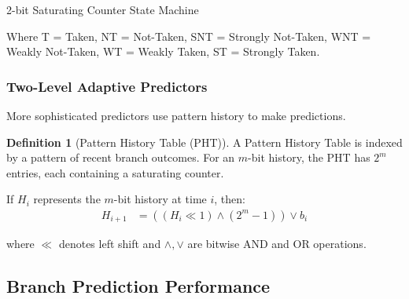 \documentclass[11pt,a4paper]{article}
\theoremstyle{definition}
\newtheorem{definition}{Definition}[section]
\begin{document}
\begin{examplebox}{2-bit Saturating Counter State Machine}
\begin{center}
\end{center}

Where T = Taken, NT = Not-Taken, SNT = Strongly Not-Taken, WNT = Weakly Not-Taken, WT = Weakly Taken, ST = Strongly Taken.
\end{examplebox}

\subsubsection{Two-Level Adaptive Predictors}

More sophisticated predictors use pattern history to make predictions.

\begin{definition}[Pattern History Table (PHT)]
A Pattern History Table is indexed by a pattern of recent branch outcomes. For an $m$-bit history, the PHT has $2^m$ entries, each containing a saturating counter.

If $H_i$ represents the $m$-bit history at time $i$, then:
\begin{align}
H_{i+1} &= ((H_i \ll 1) \land (2^m - 1)) \lor b_i
\end{align}

where $\ll$ denotes left shift and $\land, \lor$ are bitwise AND and OR operations.
\end{definition}

\subsection{Branch Prediction Performance}
\end{document}
